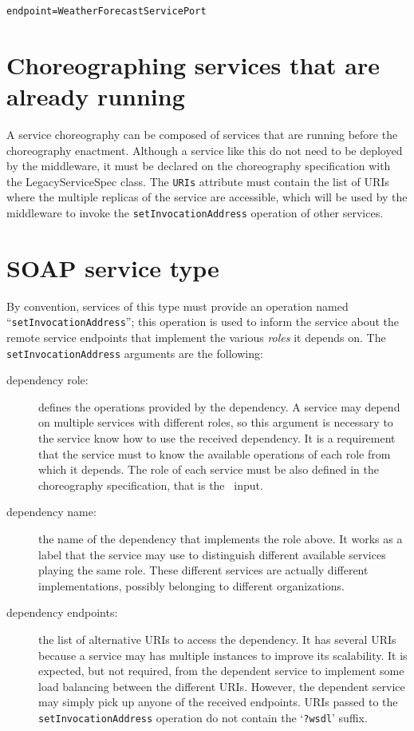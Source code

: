 {\footnotesize
\begin{lstlisting}[caption=LTS file of a simple coordination delegate that acts as a proxy, label=lst:weather_lts] 
endpoint=WeatherForecastServicePort
\end{lstlisting}
}

\section{Choreographing services that are already running}

A service choreography can be composed of services that are running before the choreography enactment. Although a service like this do not need to be deployed by the middleware, it must be declared on the choreography specification with the \textsf{LegacyServiceSpec} class. The \texttt{URIs} attribute must contain the list of URIs where the multiple replicas of the service are accessible, which will be used by the middleware to invoke the \texttt{setInvocationAddress} operation of other services. 

\section{SOAP service type}

By convention, services of this type must provide an operation named ``\texttt{setInvocationAddress}''; this operation is used to inform the service about the remote service endpoints that implement the various \emph{roles} it depends on.  The \texttt{setInvocationAddress} arguments are the following:

\begin{description}
\item [dependency role:] defines the operations provided by the dependency. A service may depend on multiple services with different roles, so this argument is necessary to the service know how to use the received dependency. It is a requirement that the service must to know the available operations of each role from which it depends. The role of each service must be also defined in the choreography specification, that is the \ee\ input.
\item [dependency name:] the name of the dependency  that implements the role above. It works as a label that the  service may use to distinguish different available services playing the same role. These different services are actually different implementations, possibly belonging to different organizations.
\item [dependency endpoints:] the list of alternative URIs to access the dependency. It has several URIs because a service may has multiple instances to improve its scalability. It is expected, but not required, from the dependent service to implement some load balancing between the different URIs. However, the dependent service may simply pick up anyone of the received endpoints. URIs passed to the \texttt{setInvocationAddress} operation do not contain the `\texttt{?wsdl}' suffix.
\end{description}

